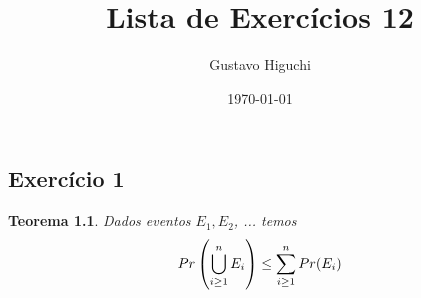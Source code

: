 \documentclass{article}
\title{Lista de Exercícios 12}
\author{Gustavo Higuchi}
\date{\today}
\begin{document}
\maketitle

\tableofcontents
\newpage


\chapter{}
\section{Exercício 1}
\newtheorem{teo1}{Teorema}
\begin{teo1}
    Dados eventos $E_1, E_2$, ... temos
    \begin{equation}
    \notag
        Pr\left(\bigcup\limits_{i \geq 1}^{n} E_i\right) \leq \sum\limits_{i \geq 1}^{n}Pr(E_i)
    \end{equation}
\end{teo1}
\end{document}
